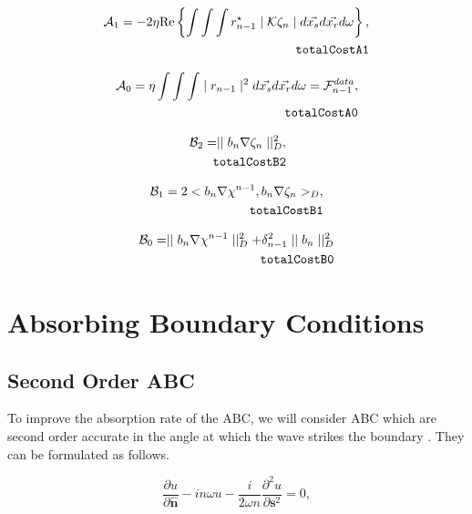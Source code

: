 \documentclass[10pt,a4paper]{article}
\newcommand{\real}[1]{\text{Re} \left\{ #1 \right\}}
\newcommand{\n}{\mathbf{n}}
\newcommand{\s}{\mathbf{s}}
\begin{document}
{\begin{align} \label{eq:totalCostA1} \mathcal{A}_1 = -2 \eta \real{\int
\int \int r^{\star}_{n-1} \mid \mathcal{K} \zeta_n \mid
d\vec{x_s}d\vec{x_r}d\omega} , \\
\tag*{\texttt{totalCostA1}}
\end{align}

\begin{align} \label{eq:totalCostA0} \mathcal{A}_0 = \eta \int \int \int
\mid r_{n-1} \mid^2 d\vec{x_s}d\vec{x_r}d\omega =
\mathcal{F}^{data}_{n-1} , \\
\tag*{\texttt{totalCostA0}}
 \end{align}

\begin{align} \label{eq:totalCostB2} \mathcal{B}_2 = \mid \mid b_n \nabla
\zeta_n \mid \mid^{2}_D ,\\
\tag*{\texttt{totalCostB2}}
\end{align}

\begin{align} \label{eq:totalCostB1} \mathcal{B}_1 = 2 < b_n
\nabla\chi^{n-1}, b_n \nabla \zeta_n >_D, \\
\tag*{\texttt{totalCostB1}}
\end{align}

\begin{align} \label{eq:totalCostB0} \mathcal{B}_0 = \mid \mid b_n \nabla
\chi^{n-1} \mid \mid^{2}_D + \delta^{2}_{n-1} \mid \mid b_n \mid
\mid^{2}_D\\
\tag*{\texttt{totalCostB0}}
\end{align}

\section{Absorbing Boundary Conditions}\label{sec:ABC}
\subsection{Second Order ABC}
To improve the absorption rate of the ABC, we will consider ABC which are second order accurate in the angle at which the wave strikes the boundary \cite{AbsorpationRates}. They can be formulated as follows.

\begin{equation} \label{eqn:SecondOrderABC}
\frac{\partial u}{\partial \hat{\n}} - in\omega u - \frac{i}{2\omega n}\frac{\partial^2 u}{\partial \s^2}=0,
\end{equation}

}
\end{document}
